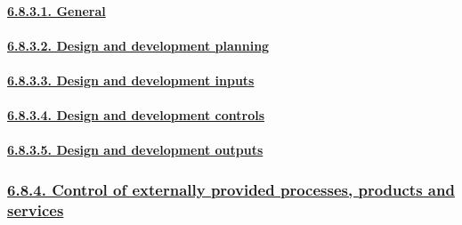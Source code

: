 \documentclass[
]{article}
\begin{document}
\hypertarget{general-4}{%
\paragraph{\texorpdfstring{\protect\hyperlink{general-13}{6.8.3.1.
General}}{6.8.3.1. General}}\label{general-4}}

\hypertarget{design-and-development-planning}{%
\paragraph{\texorpdfstring{\protect\hyperlink{design-and-development-planning-1}{6.8.3.2.
Design and development
planning}}{6.8.3.2. Design and development planning}}\label{design-and-development-planning}}

\hypertarget{design-and-development-inputs}{%
\paragraph{\texorpdfstring{\protect\hyperlink{design-and-development-inputs-1}{6.8.3.3.
Design and development
inputs}}{6.8.3.3. Design and development inputs}}\label{design-and-development-inputs}}

\hypertarget{design-and-development-controls}{%
\paragraph{\texorpdfstring{\protect\hyperlink{design-and-development-controls-1}{6.8.3.4.
Design and development
controls}}{6.8.3.4. Design and development controls}}\label{design-and-development-controls}}

\hypertarget{design-and-development-outputs}{%
\paragraph{\texorpdfstring{\protect\hyperlink{design-and-development-outputs-1}{6.8.3.5.
Design and development
outputs}}{6.8.3.5. Design and development outputs}}\label{design-and-development-outputs}}

\hypertarget{control-of-externally-provided-processes-products-and-services}{%
\subsubsection{\texorpdfstring{\protect\hyperlink{control-of-externally-provided-processes-products-and-services-1}{6.8.4.
Control of externally provided processes, products and
services}}{6.8.4. Control of externally provided processes, products and services}}\label{control-of-externally-provided-processes-products-and-services}}
\end{document}

